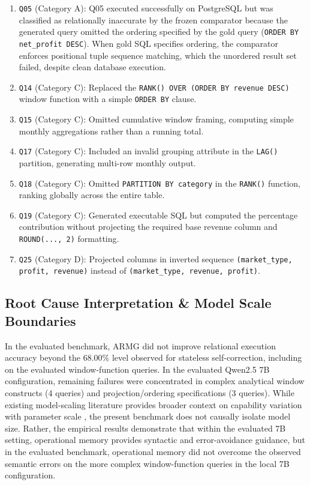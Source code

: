 \begin{enumerate}
    \item \texttt{Q05} (Category A): Q05 executed successfully on PostgreSQL but was classified as relationally inaccurate by the frozen comparator because the generated query omitted the ordering specified by the gold query (\texttt{ORDER BY net\_profit DESC}). When gold SQL specifies ordering, the comparator enforces positional tuple sequence matching, which the unordered result set failed, despite clean database execution.
    \item \texttt{Q14} (Category C): Replaced the \texttt{RANK() OVER (ORDER BY revenue DESC)} window function with a simple \texttt{ORDER BY} clause.
    \item \texttt{Q15} (Category C): Omitted cumulative window framing, computing simple monthly aggregations rather than a running total.
    \item \texttt{Q17} (Category C): Included an invalid grouping attribute in the \texttt{LAG()} partition, generating multi-row monthly output.
    \item \texttt{Q18} (Category C): Omitted \texttt{PARTITION BY category} in the \texttt{RANK()} function, ranking globally across the entire table.
    \item \texttt{Q19} (Category C): Generated executable SQL but computed the percentage contribution without projecting the required base revenue column and \texttt{ROUND(..., 2)} formatting.
    \item \texttt{Q25} (Category D): Projected columns in inverted sequence \texttt{(market\_type, profit, revenue)} instead of \texttt{(market\_type, revenue, profit)}.
\end{enumerate}

\subsection{Root Cause Interpretation \& Model Scale Boundaries}
In the evaluated benchmark, ARMG did not improve relational execution accuracy beyond the 68.00\% level observed for stateless self-correction, including on the evaluated window-function queries. In the evaluated Qwen2.5 7B configuration, remaining failures were concentrated in complex analytical window constructs (4 queries) and projection/ordering specifications (3 queries). While existing model-scaling literature provides broader context on capability variation with parameter scale \cite{wei2022emergent}, the present benchmark does not causally isolate model size. Rather, the empirical results demonstrate that within the evaluated 7B setting, operational memory provides syntactic and error-avoidance guidance, but in the evaluated benchmark, operational memory did not overcome the observed semantic errors on the more complex window-function queries in the local 7B configuration.


